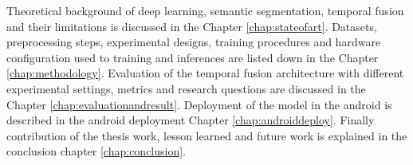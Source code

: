     Theoretical background of deep learning, semantic segmentation, temporal fusion and their limitations is discussed in the Chapter \ref{chap:stateofart}. Datasets, preprocessing steps, experimental designs, training procedures and hardware configuration used to training and inferences are listed down in the Chapter \ref{chap:methodology}. Evaluation of the temporal fusion architecture with different experimental settings, metrics and research questions are discussed in the Chapter \ref{chap:evaluationandresult}. Deployment of the model in the android is described in the android deployment Chapter \ref{chap:androiddeploy}. Finally contribution of the thesis work, lesson learned and future work is explained in the conclusion chapter \ref{chap:conclusion}. 
   
